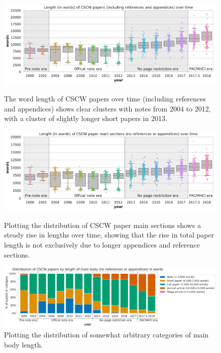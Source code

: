 \documentclass[format=acmsmall, screen=true]{acmart}
\begin{document}
\begin{figure}[h!]
  \includegraphics[width=1.04\textwidth]{figures/word-len-all.pdf}
  \vspace{-20px}
  \caption{The word length of CSCW papers over time (including references and appendices) shows clear clusters with notes from 2004 to 2012, with a cluster of slightly longer short papers in 2013.}
  \label{fig:word-len-all}
\vspace{20px}
  \includegraphics[width=1.04\textwidth]{figures/word-len-body.pdf}
 \vspace{-20px}
  \caption{Plotting the distribution of CSCW paper main sections shows a steady rise in lengths over time, showing that the rise in total paper length is not exclusively due to longer appendices and reference sections.}
  \label{fig:word-len-body}
  \vspace{20px}
  
  \includegraphics[width=1.04\textwidth]{figures/dist-len-cat.pdf}
  \caption{Plotting the distribution of somewhat arbitrary categories of main body length.}
  \label{fig:dist-len-cat}
\end{figure}
\end{document}
